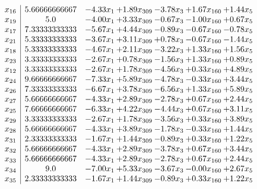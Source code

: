 \documentclass[8pt]{article}
\begin{document}
\[\begin{array}{c| c c@{\hskip 2pt} c@{\hskip 2pt} c@{\hskip 2pt} c@{\hskip 2pt} c@{\hskip 2pt} }
 x_{16}   &  5.66666666667 & -4.33 x_{1} & +  1.89 x_{309} & -3.78 x_{3} & +  1.67 x_{160} & +  1.44 x_{5}\\
 x_{19}   &  5.0 & -4.00 x_{1} & +  3.33 x_{309} & -0.67 x_{3} & -1.00 x_{160} & +  0.67 x_{5}\\
 x_{17}   &  7.33333333333 & -5.67 x_{1} & +  4.44 x_{309} & -0.89 x_{3} & -0.67 x_{160} & -0.78 x_{5}\\
 x_{21}   &  5.33333333333 & -3.67 x_{1} & +  3.11 x_{309} & +  0.78 x_{3} & -0.67 x_{160} & -1.44 x_{5}\\
 x_{18}   &  5.33333333333 & -4.67 x_{1} & +  2.11 x_{309} & -3.22 x_{3} & +  1.33 x_{160} & +  1.56 x_{5}\\
 x_{23}   &  3.33333333333 & -2.67 x_{1} & +  0.78 x_{309} & -1.56 x_{3} & +  1.33 x_{160} & +  0.89 x_{5}\\
 x_{12}   &  3.33333333333 & -2.67 x_{1} & +  1.78 x_{309} & -4.56 x_{3} & +  0.33 x_{160} & +  4.89 x_{5}\\
 x_{24}   &  9.66666666667 & -7.33 x_{1} & +  5.89 x_{309} & -4.78 x_{3} & -0.33 x_{160} & +  3.44 x_{5}\\
 x_{26}   &  7.33333333333 & -6.67 x_{1} & +  3.78 x_{309} & -6.56 x_{3} & +  1.33 x_{160} & +  5.89 x_{5}\\
 x_{27}   &  5.66666666667 & -4.33 x_{1} & +  2.89 x_{309} & -2.78 x_{3} & +  0.67 x_{160} & +  2.44 x_{5}\\
 x_{25}   &  7.66666666667 & -6.33 x_{1} & +  4.22 x_{309} & -4.44 x_{3} & +  0.67 x_{160} & +  3.11 x_{5}\\
 x_{29}   &  3.33333333333 & -2.67 x_{1} & +  1.78 x_{309} & -3.56 x_{3} & +  0.33 x_{160} & +  3.89 x_{5}\\
 x_{28}   &  5.66666666667 & -4.33 x_{1} & +  3.89 x_{309} & -1.78 x_{3} & -0.33 x_{160} & +  1.44 x_{5}\\
 x_{31}   &  2.33333333333 & -1.67 x_{1} & +  1.44 x_{309} & -0.89 x_{3} & +  0.33 x_{160} & +  1.22 x_{5}\\
 x_{32}   &  5.66666666667 & -4.33 x_{1} & +  2.89 x_{309} & -3.78 x_{3} & +  0.67 x_{160} & +  3.44 x_{5}\\
 x_{33}   &  5.66666666667 & -4.33 x_{1} & +  2.89 x_{309} & -2.78 x_{3} & +  0.67 x_{160} & +  2.44 x_{5}\\
 x_{34}   &  9.0 & -7.00 x_{1} & +  5.33 x_{309} & -3.67 x_{3} & -0.00 x_{160} & +  2.67 x_{5}\\
 x_{35}   &  2.33333333333 & -1.67 x_{1} & +  1.44 x_{309} & -0.89 x_{3} & +  0.33 x_{160} & +  1.22 x_{5}\\

\end{array}\]
\end{document}
